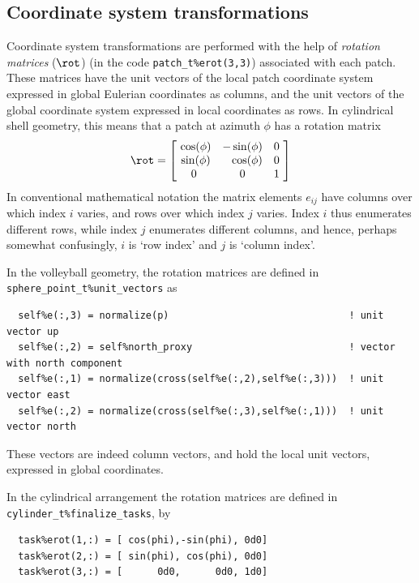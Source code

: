 \documentclass[paper=a4,fontsize=11pt]{scrartcl}
\numberwithin{equation}{section}		%
\numberwithin{figure}{section}			%
\numberwithin{table}{section}				%
\newcommand{\codecolor}{\color{Blue}}
\newcommand{\Code}[1]{{\codecolor\texttt{#1}}}
\begin{document}
\subsection{Coordinate system transformations}
\def\src{\mathrm{source}}
\def\tgt{\mathrm{target}}
Coordinate system transformations are performed with the help of \textit{rotation matrices} ($\rot$) (in the code \Code{patch\_t\%erot(3,3)}) associated with each patch.  These matrices have the unit vectors of the local patch coordinate system expressed in global Eulerian coordinates as columns, and the unit vectors of the global coordinate system expressed in local coordinates as rows.  In cylindrical shell geometry, this means that a patch at azimuth $\phi$ has a rotation matrix
\begin{equation}
\rot = 
\begin{bmatrix}
\ \cos(\phi) & -\sin(\phi) & 0\ \\
\ \sin(\phi) & \ \ \,\cos(\phi) & 0\ \\
         0 &          0 & 1\ 
\end{bmatrix}
\end{equation}
In conventional mathematical notation the matrix elements $e_{ij}$ have columns over which index $i$ varies, and rows over which index $j$ varies.  Index $i$ thus enumerates different rows, while index $j$ enumerates different columns, and hence, perhaps somewhat confusingly, $i$ is `row index' and $j$ is `column index'.

In the volleyball geometry, the rotation matrices are defined in \Code{sphere\_point\_t\%unit\_vectors} as
{\codecolor\small\begin{verbatim}
  self%e(:,3) = normalize(p)                               ! unit vector up
  self%e(:,2) = self%north_proxy                           ! vector with north component
  self%e(:,1) = normalize(cross(self%e(:,2),self%e(:,3)))  ! unit vector east
  self%e(:,2) = normalize(cross(self%e(:,3),self%e(:,1)))  ! unit vector north
\end{verbatim}}
These vectors are indeed column vectors, and hold the local unit vectors, expressed in global coordinates.
    
In the cylindrical arrangement the rotation matrices are defined in \Code{cylinder\_t\%finalize\_tasks}, by
{\codecolor\small\begin{verbatim}
  task%erot(1,:) = [ cos(phi),-sin(phi), 0d0]
  task%erot(2,:) = [ sin(phi), cos(phi), 0d0]
  task%erot(3,:) = [      0d0,      0d0, 1d0]
\end{verbatim}}
\end{document}
